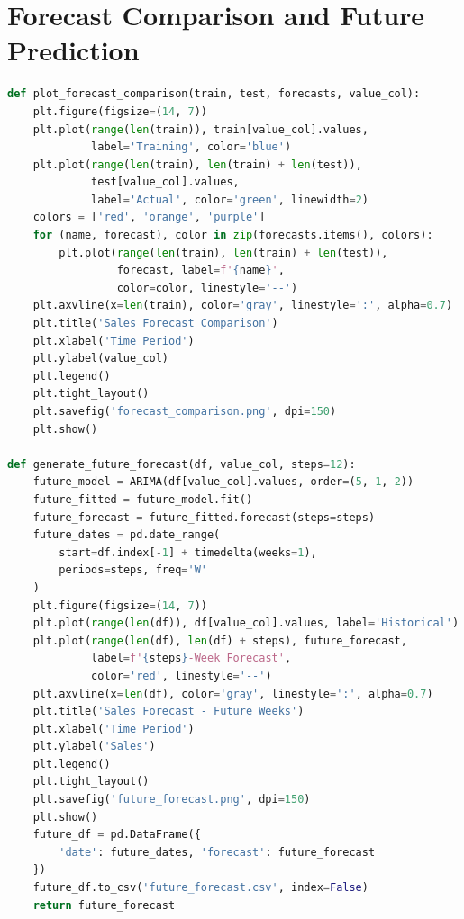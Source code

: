 \documentclass[12pt,a4paper]{report}
\begin{document}
\section{Forecast Comparison and Future Prediction}
\begin{lstlisting}[language=Python, caption={Comparison plot and future forecast}]
def plot_forecast_comparison(train, test, forecasts, value_col):
    plt.figure(figsize=(14, 7))
    plt.plot(range(len(train)), train[value_col].values,
             label='Training', color='blue')
    plt.plot(range(len(train), len(train) + len(test)),
             test[value_col].values,
             label='Actual', color='green', linewidth=2)
    colors = ['red', 'orange', 'purple']
    for (name, forecast), color in zip(forecasts.items(), colors):
        plt.plot(range(len(train), len(train) + len(test)),
                 forecast, label=f'{name}',
                 color=color, linestyle='--')
    plt.axvline(x=len(train), color='gray', linestyle=':', alpha=0.7)
    plt.title('Sales Forecast Comparison')
    plt.xlabel('Time Period')
    plt.ylabel(value_col)
    plt.legend()
    plt.tight_layout()
    plt.savefig('forecast_comparison.png', dpi=150)
    plt.show()

def generate_future_forecast(df, value_col, steps=12):
    future_model = ARIMA(df[value_col].values, order=(5, 1, 2))
    future_fitted = future_model.fit()
    future_forecast = future_fitted.forecast(steps=steps)
    future_dates = pd.date_range(
        start=df.index[-1] + timedelta(weeks=1),
        periods=steps, freq='W'
    )
    plt.figure(figsize=(14, 7))
    plt.plot(range(len(df)), df[value_col].values, label='Historical')
    plt.plot(range(len(df), len(df) + steps), future_forecast,
             label=f'{steps}-Week Forecast',
             color='red', linestyle='--')
    plt.axvline(x=len(df), color='gray', linestyle=':', alpha=0.7)
    plt.title('Sales Forecast - Future Weeks')
    plt.xlabel('Time Period')
    plt.ylabel('Sales')
    plt.legend()
    plt.tight_layout()
    plt.savefig('future_forecast.png', dpi=150)
    plt.show()
    future_df = pd.DataFrame({
        'date': future_dates, 'forecast': future_forecast
    })
    future_df.to_csv('future_forecast.csv', index=False)
    return future_forecast
\end{lstlisting}
\end{document}

